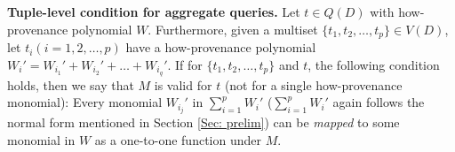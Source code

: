 \begin{definition}\label{Def: validity condition agg}
{\bf Tuple-level condition for aggregate queries.}
Let $t \in Q(D)$ with how-provenance polynomial $W$.
Furthermore, given a multiset $\{t_1, t_2,\dots, t_p\} \in V(D)$, let $t_i (i=1,2,\dots,p)$ have a how-provenance polynomial $W_i'=W_{i_1}' + W_{i_2}' + \dots + W_{i_q}'$.
If for $\{t_1, t_2,\dots, t_p\}$ and $t$, the following condition holds, then we say that $M$ is valid for $t$ (not for a single how-provenance monomial):
Every monomial $W_{i_j}'$ in $\sum_{i=1}^pW_i'$ ($\sum_{i=1}^pW_i'$ again follows the normal form mentioned in Section \ref{Sec: prelim}) can be {\em mapped} to some monomial in $W$ %
as a one-to-one function under $M$.


\end{definition}

